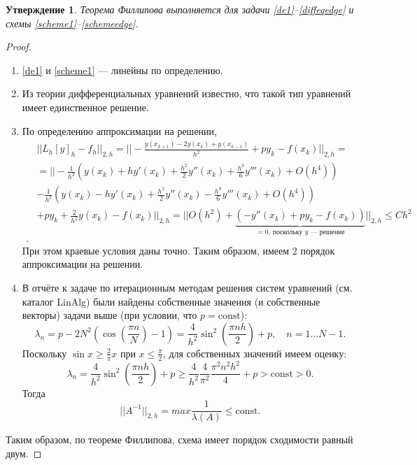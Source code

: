 \documentclass[14pt,a4paper]{extarticle}
\newtheorem{proposition}{Утверждение} %
\newcommand{\1}{\mathbbm{1}}
\begin{document}
\begin{proposition}
    Теорема Филлипова выполняется для задачи \eqref{de1}--\eqref{diffeqedge} и схемы \eqref{scheme1}--\eqref{schemeedge}.
\end{proposition}
\begin{proof}
    \begin{enumerate}
        \item  \eqref{de1} и \eqref{scheme1} --- линейны по определению.
        \item Из теории дифференциальных уравнений известно, что такой тип уравнений имеет единственное решение.
        \item По определению аппроксимации на решении,
        \begin{align*}
            & || L_h [y]_h - f_h || _{2, h} = || -\frac{y(x_{k+1}) - 2 y(x_k) + y(x_{k-1})}{h^2} + p y_k - f(x_k) || _{2, h} = \\ 
            & =|| -\frac{1}{h^2}\left(y(x_{k}) + h y'(x_{k}) + \frac{h^2}{2} y''(x_{k}) + \frac{h^3}{6} y'''(x_{k}) + O(h^4)\right)  \\
            & -\frac{1}{h^2}\left(y(x_{k}) - h y'(x_{k}) + \frac{h^2}{2} y''(x_{k}) - \frac{h^3}{6} y'''(x_{k}) + O(h^4)\right) \\ 
            & + p y_k + \frac{2}{h^2} y(x_k) - f(x_k) || _{2, h} = || O(h^2) + \underbrace{(- y''(x_{k}) + p y_k - f(x_k))}_{=0 \text{, поскольку $y$ --- решение}} ||_{2, h} \leq C h^2 \\ .           
        \end{align*}
        При этом краевые условия даны точно. Таким образом, имеем 2 порядок аппроксимации на решении.
        \item В отчёте к задаче по итерационным методам решения систем уравнений (см. каталог LinAlg) были найдены собственные значения 
        (и собственные векторы) задачи выше (при условии, что $p = \text{const}$): 
        \begin{equation*}
            \lambda_n = p - 2 N^2 (\cos(\frac{\pi n}{N}) - 1) = \frac{4}{h^2} \sin^2(\frac{\pi n h}{2}) + p, \quad n = 1 \ldots N - 1.
        \end{equation*}
        Поскольку $\sin x \geq \frac{2}{\pi} x $ при $x \leq \frac{\pi}{2}$, для собственных значений имеем оценку:
        \begin{equation*}
            \lambda_n = \frac{4}{h^2} \sin^2(\frac{\pi n h}{2}) + p \geq \frac{4}{h^2} \frac{4}{\pi ^2} \frac{\pi ^2 n^2 h^2}{4} + p > \text{const} > 0.
        \end{equation*}
        Тогда
        \begin{equation*}
            || A^{-1} ||_{2,h} = max \frac{1}{\lambda(A)} \leq \text{const}.
        \end{equation*}
    \end{enumerate}
    Таким образом, по теореме Филлипова, схема имеет порядок сходимости равный двум.
\end{proof}
\end{document}
